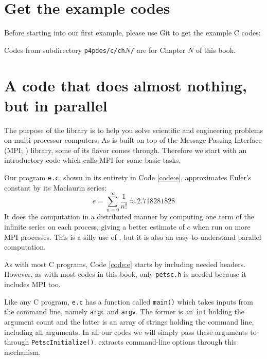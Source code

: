 
\section{Get the example codes}

Before starting into our first example, please use Git to get the example C codes:
Codes from subdirectory \texttt{p4pdes/c/ch}$N$\texttt{/} are for Chapter $N$ of this book.

\section{A code that does almost nothing, but in parallel}

The purpose of the \PETSc library is to help you solve scientific and engineering problems on multi-processor computers.  As \PETSc is built on top of the Message Passing Interface (MPI; \citep{Groppetal1999}) library, some of its flavor comes through.  Therefore we start with an introductory \PETSc code which calls MPI for some basic tasks.

Our program \texttt{e.c}, shown in its entirety in Code \ref{code:e}, approximates Euler's constant by its Maclaurin series:
\begin{equation}
e = \sum_{n = 0}^\infty \frac{1}{n!} \approx 2.718281828 \label{eq:gs:introseries}
\end{equation}
It does the computation in a distributed manner by computing one term of the infinite series on each process, giving a better estimate of $e$ when run on more MPI processes. This is a silly use of \PETSc, but it is also an easy-to-understand parallel computation.

As with most C programs, Code \ref{code:e} starts by including needed headers.  However, as with most codes in this book, only \texttt{petsc.h} is needed because it includes MPI too.

Like any C program, \texttt{e.c} has a function called \texttt{main()} which takes inputs from the command line, namely \texttt{argc} and \texttt{argv}.  The former is an \texttt{int} holding the argument count and the latter is an array of strings holding the command line, including all arguments.  In all our codes we will simply pass these arguments to \PETSc through \texttt{PetscInitialize()}.  \PETSc extracts command-line options through this mechanism.

